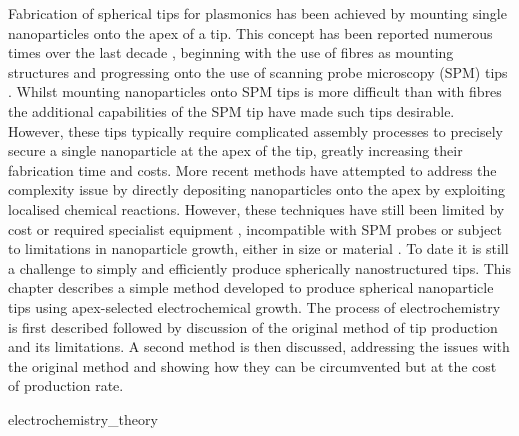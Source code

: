 \documentclass[12pt, a4paper, twoside]{book}
\begin{document}
Fabrication of spherical tips for plasmonics has been achieved by mounting single nanoparticles onto the apex of a tip. This concept has been reported numerous times over the last decade \cite{gan2007}, beginning with the use of fibres as mounting structures \cite{kalkbrenner2001, barsegova2002, sqalli2002, kawata2003} and progressing onto the use of scanning probe microscopy (SPM) tips \cite{umakoshi2012, hayazawa2012, park2012, okamoto2001, vakarelski2006}. Whilst mounting nanoparticles onto SPM tips is more difficult than with fibres the additional capabilities of the SPM tip have made such tips desirable. However, these tips typically require complicated assembly processes to precisely secure a single nanoparticle at the apex of the tip, greatly increasing their fabrication time and costs. More recent methods have attempted to address the complexity issue by directly depositing nanoparticles onto the apex by exploiting localised chemical reactions. However, these techniques have still been limited by cost or required specialist equipment \cite{sqalli2002, okamoto2001}, incompatible with SPM probes \cite{kharintsev2013, barsegova2002} or subject to limitations in nanoparticle growth, either in size \cite{cheng2013} or material \cite{umakoshi2012}.
To date it is still a challenge to simply and efficiently produce spherically nanostructured tips. This chapter describes a simple method developed to produce spherical nanoparticle tips using apex-selected electrochemical growth.
The process of electrochemistry is first described followed by discussion of the original method of tip production and its limitations. A second method is then discussed, addressing the issues with the original method and showing how they can be circumvented but at the cost of production rate.

{electrochemistry_theory}
\end{document}
